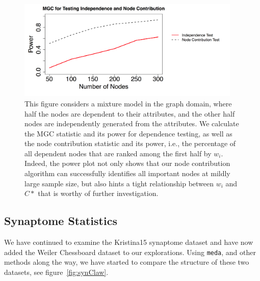 \documentclass[simplex.tex]{subfiles}
\begin{document}
\begin{figure}[h!]
\begin{cframed}
\centering
\includegraphics[width=0.95\textwidth]{./figs/mgcPow.png}
\caption{
This figure considers a mixture model in the graph domain,
where half the nodes are dependent to their attributes, and the other
half nodes are independently generated from the attributes. We calculate
the MGC statistic and its power for dependence testing, as well as the
node contribution statistic and its power, i.e., the percentage of all
dependent nodes that are ranked among the first half by $w_i$.  Indeed,
the power plot not only shows that our node contribution algorithm can
successfully identifies all important nodes at mildly large sample size,
but also hints a tight relationship between $w_i$ and $C*$ that is
worthy of further investigation. 
}
\label{fig:mgcP}
\end{cframed}
\end{figure}


\subsection{Synaptome Statistics}

We have continued to examine the Kristina15 synaptome dataset and have
now added the Weiler Chessboard dataset to our explorations.  Using 
\verb+meda+, and other methods along the way, we have started to compare
the structure of these two datasets, see figure~\ref{fig:synClaw}.  
\end{document}
